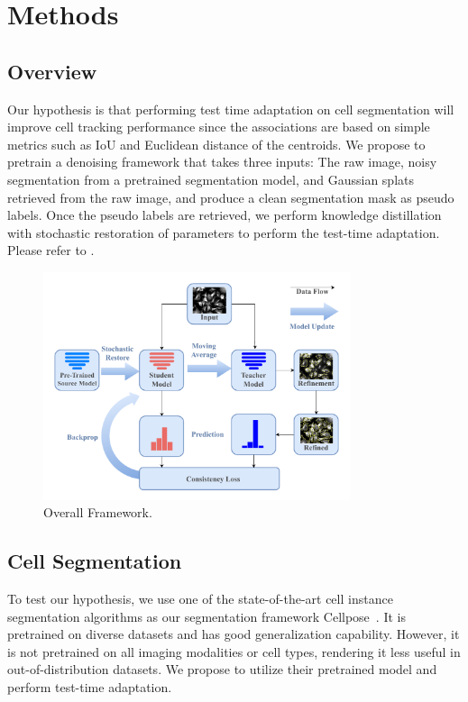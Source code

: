 \section{Methods}

\subsection{Overview}

Our hypothesis is that performing test time adaptation on cell segmentation will improve cell tracking performance since the associations are based on simple metrics such as IoU and Euclidean distance of the centroids. We propose to pretrain a denoising framework that takes three inputs: The raw image, noisy segmentation from a pretrained segmentation model, and Gaussian splats retrieved from the raw image, and produce a clean segmentation mask as pseudo labels.
Once the pseudo labels are retrieved, we perform knowledge distillation with stochastic restoration of parameters to perform the test-time adaptation. Please refer to .


\begin{figure}[t]
    \centering
    \includegraphics[width=9cm]{figs/project_proposal.pdf}
    \caption{Overall Framework.}
    \label{fig:overall_framework}
\end{figure}

\subsection{Cell Segmentation}

To test our hypothesis, we use one of the state-of-the-art cell instance segmentation algorithms as our segmentation framework Cellpose~\cite{stringer2021cellpose}. It is pretrained on diverse datasets and has good generalization capability. However, it is not pretrained on all imaging modalities or cell types, rendering it less useful in out-of-distribution datasets. We propose to utilize their pretrained model and perform test-time adaptation. 

